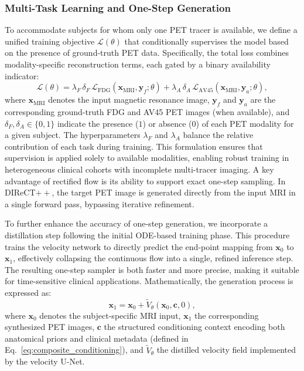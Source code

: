 \documentclass[a4paper]{cas-sc}
\begin{document}
\subsubsection{Multi-Task Learning and One-Step Generation}
To accommodate subjects for whom only one PET tracer is available, we define a unified training objective $\mathcal{L}(\theta)$ that conditionally supervises the model based on the presence of ground-truth PET data. Specifically, the total loss combines modality-specific reconstruction terms, each gated by a binary availability indicator:
\begin{equation}
\mathcal{L}(\theta) = \lambda_F \, \delta_F \, \mathcal{L}_{\text{FDG}}(\mathbf{x}_{\text{MRI}}, \mathbf{y}_f; \theta) + \lambda_A \, \delta_A \, \mathcal{L}_{\text{AV45}}(\mathbf{x}_{\text{MRI}}, \mathbf{y}_a; \theta),
\end{equation}
where $\mathbf{x}_{\text{MRI}}$ denotes the input magnetic resonance image, $\mathbf{y}_f$ and $\mathbf{y}_a$ are the corresponding ground-truth FDG and AV45 PET images (when available), and $\delta_F, \delta_A \in \{0,1\}$ indicate the presence ($1$) or absence ($0$) of each PET modality for a given subject. The hyperparameters $\lambda_F$ and $\lambda_A$ balance the relative contribution of each task during training. This formulation ensures that supervision is applied solely to available modalities, enabling robust training in heterogeneous clinical cohorts with incomplete multi-tracer imaging.
A key advantage of rectified flow is its ability to support exact one-step sampling. In DIReCT$++$, the target PET image is generated directly from the input MRI in a single forward pass, bypassing iterative refinement. 

To further enhance the accuracy of one-step generation, we incorporate a distillation step following the initial ODE-based training phase. This procedure trains the velocity network to directly predict the end-point mapping from $\mathbf{x}_0$ to $\mathbf{x}_1$, effectively collapsing the continuous flow into a single, refined inference step. The resulting one-step sampler is both faster and more precise, making it suitable for time-sensitive clinical applications. Mathematically, the generation process is expressed as:
\begin{equation}
\mathbf{x}_1 = \mathbf{x}_0 + \tilde{V}_\theta(\mathbf{x}_0, \mathbf{c}, 0),
\end{equation}
where $\mathbf{x}_0 $ denotes the subject-specific MRI input, $\mathbf{x}_1 $ the corresponding synthesized PET images, $\mathbf{c}$ the structured conditioning context encoding both anatomical priors and clinical metadata (defined in Eq.~\eqref{eq:composite_conditioning}), and $\tilde{V}_\theta$ the distilled velocity field implemented by the velocity U-Net.
\end{document}
